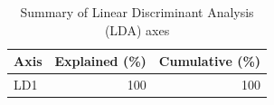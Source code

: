 \begin{table}[htbp]
  \centering
  \caption{Summary of Linear Discriminant Analysis (LDA) axes}
  \label{tab:03_LDA_Classification_lda_axes_summary}
  \begin{tabular}{lrr}
    \toprule
    Axis & Explained (\%) & Cumulative (\%) \\
    \midrule
    LD1 & 100 & 100 \\
    \bottomrule
  \end{tabular}
\end{table}
